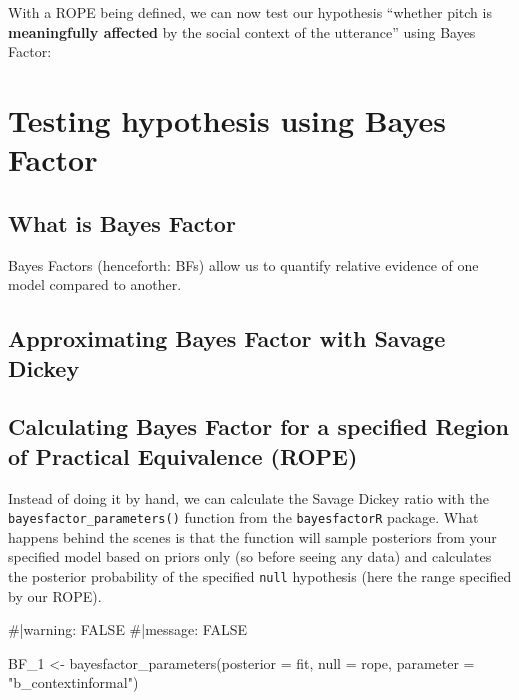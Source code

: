 \documentclass[
  doc,
  longtable,
  nolmodern,
  notxfonts,
  notimes,
  colorlinks=true,linkcolor=blue,citecolor=blue,urlcolor=blue]{apa7}
\newenvironment{Shaded}{\begin{snugshade}}{\end{snugshade}}
\newcommand{\AttributeTok}[1]{\textcolor[rgb]{0.40,0.45,0.13}{#1}}
\newcommand{\CommentTok}[1]{\textcolor[rgb]{0.37,0.37,0.37}{#1}}
\newcommand{\FunctionTok}[1]{\textcolor[rgb]{0.28,0.35,0.67}{#1}}
\newcommand{\NormalTok}[1]{\textcolor[rgb]{0.00,0.23,0.31}{#1}}
\newcommand{\OtherTok}[1]{\textcolor[rgb]{0.00,0.23,0.31}{#1}}
\newcommand{\StringTok}[1]{\textcolor[rgb]{0.13,0.47,0.30}{#1}}
\begin{document}
With a ROPE being defined, we can now test our hypothesis ``whether
pitch is \textbf{meaningfully affected} by the social context of the
utterance'' using Bayes Factor:

\section{Testing hypothesis using Bayes
Factor}\label{testing-hypothesis-using-bayes-factor}

\subsection{What is Bayes Factor}\label{what-is-bayes-factor}

Bayes Factors (henceforth: BFs) allow us to quantify relative evidence
of one model compared to another.

\subsection{Approximating Bayes Factor with Savage
Dickey}\label{approximating-bayes-factor-with-savage-dickey}

\subsection{Calculating Bayes Factor for a specified Region of Practical
Equivalence
(ROPE)}\label{calculating-bayes-factor-for-a-specified-region-of-practical-equivalence-rope}

Instead of doing it by hand, we can calculate the Savage Dickey ratio
with the \texttt{bayesfactor\_parameters()} function from the
\texttt{bayesfactorR} package. What happens behind the scenes is that
the function will sample posteriors from your specified model based on
priors only (so before seeing any data) and calculates the posterior
probability of the specified \texttt{null} hypothesis (here the range
specified by our ROPE).

\begin{Shaded}
\begin{Highlighting}[]
\CommentTok{\#|warning: FALSE}
\CommentTok{\#|message: FALSE}

\NormalTok{BF\_1 }\OtherTok{\textless{}{-}} \FunctionTok{bayesfactor\_parameters}\NormalTok{(}\AttributeTok{posterior =}\NormalTok{ fit, }
                               \AttributeTok{null =}\NormalTok{ rope, }
                               \AttributeTok{parameter =} \StringTok{"b\_contextinformal"}\NormalTok{)}
\end{Highlighting}
\end{Shaded}
\end{document}
